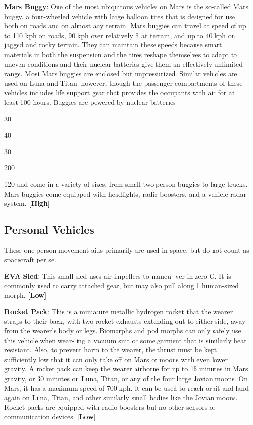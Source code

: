 \textbf{Mars Buggy}: One of the most ubiquitous vehicles 
on Mars is the so-called Mars buggy, a four-wheeled 
vehicle with large balloon tires that is designed for 
use both on roads and on almost any terrain. Mars 
buggies can travel at speed of up to 110 kph on roads, 
90 kph over relatively fl at terrain, and up to 40 kph 
on jagged and rocky terrain. They can maintain these 
speeds because smart materials in both the suspension 
and the tires reshape themselves to adapt to uneven 
conditions and their nuclear batteries give them an 
effectively unlimited range. Most Mars buggies are 
enclosed but unpressurized. Similar vehicles are used 
on Luna and Titan, however, though the passenger 
compartments of these vehicles includes life support 
gear that provides the occupants with air for at least 
100 hours. Buggies are powered by nuclear batteries 

30

40

30

200

120
and come in a variety of sizes, from small two-person 
buggies to large trucks. Mars buggies come equipped 
with headlights, radio boosters, and a vehicle radar 
system. \textbf{[High]}

\subsection{Personal Vehicles}

These one-person movement aids primarily are used in 
space, but do not count as spacecraft per se.

\textbf{EVA Sled:} This small sled uses air impellers to maneu-
ver in zero-G. It is commonly used to carry attached gear, 
but may also pull along 1 human-sized morph. \textbf{[Low]}

\textbf{Rocket Pack}: This is a miniature metallic hydrogen 
rocket that the wearer straps to their back, with two 
rocket exhausts extending out to either side, away 
from the wearer's body or legs. Biomorphs and pod 
morphs can only safely use this vehicle when wear-
ing a vacuum suit or some garment that is similarly 
heat resistant. Also, to prevent harm to the wearer, the 
thrust must be kept sufficiently low that it can only 
take off on Mars or moons with even lower gravity. A 
rocket pack can keep the wearer airborne for up to 15 
minutes in Mars gravity, or 30 minutes on Luna, Titan, 
or any of the four large Jovian moons. On Mars, it 
has a maximum speed of 700 kph. It can be used to 
reach orbit and land again on Luna, Titan, and other 
similarly small bodies like the Jovian moons. Rocket 
packs are equipped with radio boosters but no other 
sensors or communication devices. \textbf{[Low]}

